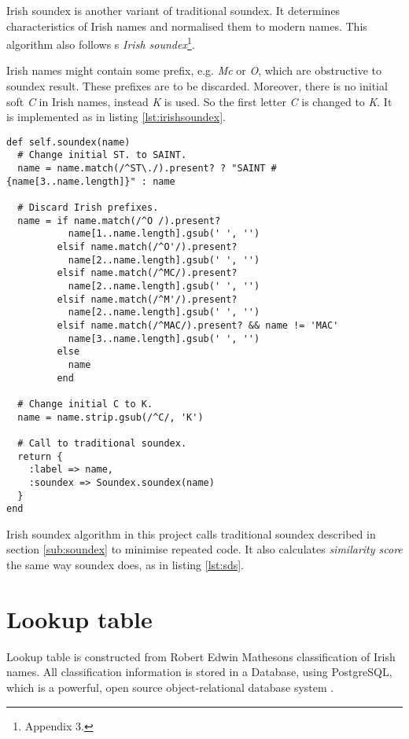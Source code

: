 Irish soundex is another variant of traditional soundex. It determines
characteristics of Irish names and normalised them to modern names.
This algorithm also follows \citeauthor{adamw}\textquotesingle s
\emph{Irish soundex}\footnote{\cite{adamw} Appendix 3.}.

Irish names might contain some prefix, e.g. \emph{Mc} or \emph{O},
which are obstructive to soundex result. These prefixes are to be
discarded. Moreover, there is no initial soft \emph{C} in Irish names,
instead \emph{K} is used. So the first letter \emph{C} is changed to \emph{K}.
It is implemented as in listing \ref{lst:irishsoundex}.

\begin{minipage}{\linewidth}
\begin{lstlisting}[label={lst:irishsoundex}, caption={Irish soundex implementation.}]
def self.soundex(name)
  # Change initial ST. to SAINT.
  name = name.match(/^ST\./).present? ? "SAINT #{name[3..name.length]}" : name

  # Discard Irish prefixes.
  name = if name.match(/^O /).present?
           name[1..name.length].gsub(' ', '')
         elsif name.match(/^O'/).present?
           name[2..name.length].gsub(' ', '')
         elsif name.match(/^MC/).present?
           name[2..name.length].gsub(' ', '')
         elsif name.match(/^M'/).present?
           name[2..name.length].gsub(' ', '')
         elsif name.match(/^MAC/).present? && name != 'MAC'
           name[3..name.length].gsub(' ', '')
         else
           name
         end

  # Change initial C to K.
  name = name.strip.gsub(/^C/, 'K')

  # Call to traditional soundex.
  return {
    :label => name,
    :soundex => Soundex.soundex(name)
  }
end
\end{lstlisting}
\end{minipage}

Irish soundex algorithm in this project calls traditional soundex
described in section \ref{sub:soundex} to minimise repeated code.
It also calculates \emph{similarity score} the same way
soundex does, as in listing \ref{lst:sds}.

\section{Lookup table}
\label{sec:lookuptable}

Lookup table is constructed from Robert Edwin Matheson\textquotesingle s
classification of Irish names. All classification information
is stored in a Database, using PostgreSQL, which is a powerful,
open source object-relational database system \cite[]{postgresql}.

